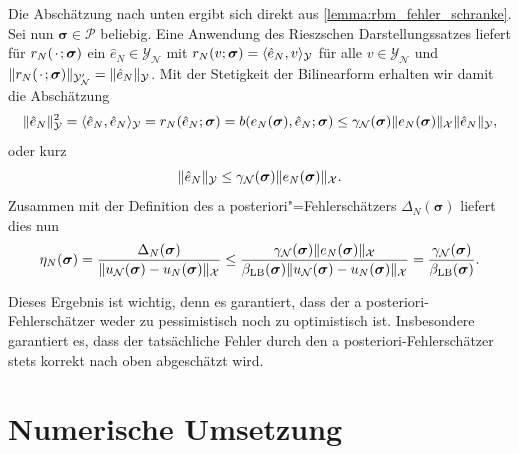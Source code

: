 \documentclass[../main.tex]{subfiles}
\begin{document}
\begin{Lemma}
    \begin{Beweis}
        Die Abschätzung nach unten ergibt sich direkt aus \cref{lemma:rbm_fehler_schranke}.
        Sei nun $\bm \sigma \in \mathcal P$ beliebig.
        Eine Anwendung des Rieszschen Darstellungssatzes liefert für $r_{N}({\mkern2mu\cdot\mkern2mu}; \bm \sigma)$ ein $\hat{e}_{N} \in \mathcal Y_{\mathcal N}$ mit $r_{N}(v; \bm \sigma) = \langle\hat{e}_{N},v\rangle_{\mathcal Y}$ für alle $v \in \mathcal Y_{\mathcal N}$ und $\lVert r_{N}({\mkern2mu\cdot\mkern2mu}; \bm \sigma)\rVert_{\mathcal Y_{\mathcal N}'} = \lVert\hat{e}_{N}\rVert_{\mathcal Y}$.
        Mit der Stetigkeit der Bilinearform erhalten wir damit die Abschätzung
        \begin{equation}
            \lVert\hat{e}_{N}\rVert_{\mathcal Y}^{2}
            = \langle\hat{e}_{N},\hat{e}_{N}\rangle_{\mathcal Y}
            = r_{N}(\hat{e}_{N}; \bm \sigma)
            = b(e_{N}(\bm \sigma), \hat{e}_{N}; \bm \sigma)
            \leq \gamma_{\mathcal N}(\bm \sigma) \lVert e_{N}(\bm \sigma)\rVert_{\mathcal X} \lVert\hat{e}_{N}\rVert_{\mathcal Y},
        \end{equation}
        oder kurz
        \begin{equation}
            \lVert\hat{e}_{N}\rVert_{\mathcal Y} \leq \gamma_{\mathcal N}(\bm \sigma) \lVert e_{N}(\bm \sigma)\rVert_{\mathcal X}.
        \end{equation}
        Zusammen mit der Definition des a posteriori"=Fehlerschätzers $\Delta_{N}(\bm \sigma)$ liefert dies nun
        \begin{equation}
            \eta_{N}(\bm \sigma)
            = \frac{\Delta_{N}(\bm \sigma)}{\lVert u_{\mathcal N}(\bm \sigma) - u_{N}(\bm \sigma)\rVert_{\mathcal X}}
            \leq \frac{\gamma_{\mathcal N}(\bm \sigma) \lVert e_{N}(\bm \sigma)\rVert_{\mathcal X}}{\beta_{\mathrm{LB}}(\bm \sigma)\lVert u_{\mathcal N}(\bm \sigma) - u_{N}(\bm \sigma)\rVert_{\mathcal X}}
            = \frac{\gamma_{\mathcal N}(\bm \sigma)}{\beta_{\mathrm{LB}}(\bm \sigma)}.
        \end{equation}
    \end{Beweis}
\end{Lemma}

Dieses Ergebnis ist wichtig, denn es garantiert, dass der a posteriori-Fehlerschätzer weder zu pessimistisch noch zu optimistisch ist.
Insbesondere garantiert es, dass der tatsächliche Fehler durch den a posteriori-Fehlerschätzer stets korrekt nach oben abgeschätzt wird.


\section{Numerische Umsetzung} %
\label{section:cha5_rbm:numerische_umsetzung}
\end{document}
